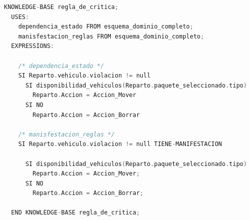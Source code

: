 \begin{lstlisting}[language=C,caption=\textbf{Regla\_de\_critica}]
  KNOWLEDGE-BASE regla_de_critica;
  USES:
    dependencia_estado FROM esquema_dominio_completo; 
    manisfestacion_reglas FROM esquema_dominio_completo;
  EXPRESSIONS:

    /* dependencia_estado */
    SI Reparto.vehiculo.violacion != null
      SI disponibilidad_vehiculos(Reparto.paquete_seleccionado.tipo)
        Reparto.Accion = Accion_Mover
      SI NO 
        Reparto.Accion = Accion_Borrar

    /* manisfestacion_reglas */
    SI Reparto.vehiculo.violacion != null TIENE-MANIFESTACION

      SI disponibilidad_vehiculos(Reparto.paquete_seleccionado.tipo)
        Reparto.Accion = Accion_Mover;
      SI NO 
        Reparto.Accion = Accion_Borrar;
      
  END KNOWLEDGE-BASE regla_de_critica;
\end{lstlisting}